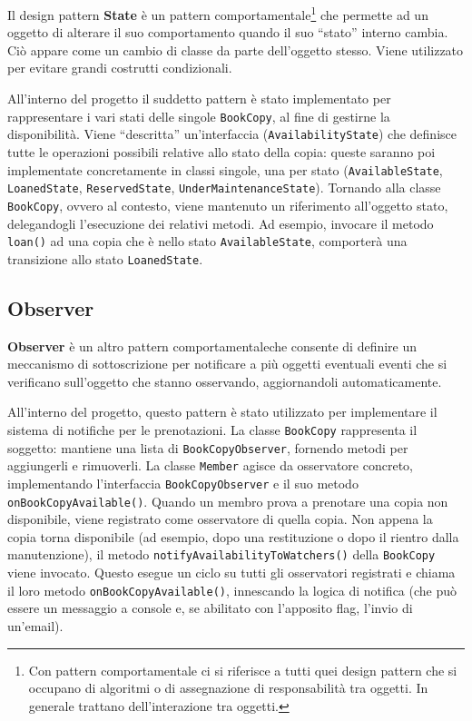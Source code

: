 \documentclass[
  italian,
  paper=a4,
  ,captions=tableheading
]{scrbook}
\newcommand{\passthrough}[1]{#1}
\begin{document}
Il design pattern \textbf{State} è un pattern
comportamentale\footnote{Con pattern comportamentale ci si riferisce a tutti quei design pattern che si occupano di algoritmi o di assegnazione di responsabilità tra oggetti. In generale trattano dell’interazione tra oggetti.}
che permette ad un oggetto di alterare il suo comportamento quando il
suo ``stato'' interno cambia. Ciò appare come un cambio di classe da
parte dell'oggetto stesso. Viene utilizzato per evitare grandi costrutti
condizionali.

All'interno del progetto il suddetto pattern è stato implementato per
rappresentare i vari stati delle singole
\passthrough{\lstinline!BookCopy!}, al fine di gestirne la
disponibilità. Viene ``descritta'' un'interfaccia
(\passthrough{\lstinline!AvailabilityState!}) che definisce tutte le
operazioni possibili relative allo stato della copia: queste saranno poi
implementate concretamente in classi singole, una per stato
(\passthrough{\lstinline!AvailableState!},
\passthrough{\lstinline!LoanedState!},
\passthrough{\lstinline!ReservedState!},
\passthrough{\lstinline!UnderMaintenanceState!}). Tornando alla classe
\passthrough{\lstinline!BookCopy!}, ovvero al contesto, viene mantenuto
un riferimento all'oggetto stato, delegandogli l'esecuzione dei relativi
metodi. Ad esempio, invocare il metodo \passthrough{\lstinline!loan()!}
ad una copia che è nello stato \passthrough{\lstinline!AvailableState!},
comporterà una transizione allo stato
\passthrough{\lstinline!LoanedState!}.

\subsection{Observer}\label{observer}

\textbf{Observer} è un altro pattern comportamentale\footnotemark[3] che
consente di definire un meccanismo di sottoscrizione per notificare a
più oggetti eventuali eventi che si verificano sull'oggetto che stanno
osservando, aggiornandoli automaticamente.

All'interno del progetto, questo pattern è stato utilizzato per
implementare il sistema di notifiche per le prenotazioni. La classe
\passthrough{\lstinline!BookCopy!} rappresenta il soggetto: mantiene una
lista di \passthrough{\lstinline!BookCopyObserver!}, fornendo metodi per
aggiungerli e rimuoverli. La classe \passthrough{\lstinline!Member!}
agisce da osservatore concreto, implementando l'interfaccia
\passthrough{\lstinline!BookCopyObserver!} e il suo metodo
\passthrough{\lstinline!onBookCopyAvailable()!}. Quando un membro prova
a prenotare una copia non disponibile, viene registrato come osservatore
di quella copia. Non appena la copia torna disponibile (ad esempio, dopo
una restituzione o dopo il rientro dalla manutenzione), il metodo
\passthrough{\lstinline!notifyAvailabilityToWatchers()!} della
\passthrough{\lstinline!BookCopy!} viene invocato. Questo esegue un
ciclo su tutti gli osservatori registrati e chiama il loro metodo
\passthrough{\lstinline!onBookCopyAvailable()!}, innescando la logica di
notifica (che può essere un messaggio a console e, se abilitato con
l'apposito flag, l'invio di un'email).
\end{document}
